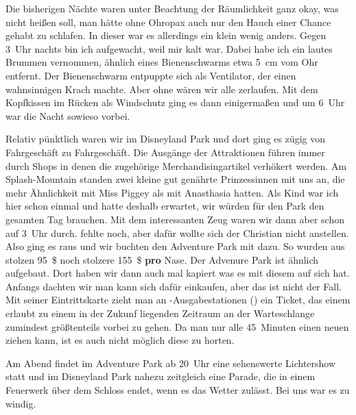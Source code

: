 Die bisherigen Nächte waren unter Beachtung der Räumlichkeit ganz okay, was nicht heißen soll, man hätte ohne Ohropax auch nur den Hauch einer Chance gehabt zu schlafen.
In dieser war es allerdings ein klein wenig anders.
Gegen 3~Uhr nachts bin ich aufgewacht, weil mir kalt war.
Dabei habe ich ein lautes Brummen vernommen, ähnlich eines Bienenschwarms etwa 5~cm vom Ohr entfernt.
Der Bienenschwarm entpuppte sich als Ventilator, der einen wahnsinnigen Krach machte.
Aber ohne wären wir alle zerlaufen.
Mit dem Kopfkissen im Rücken als Windschutz ging es dann einigermaßen und um 6~Uhr war die Nacht sowieso vorbei.

Relativ pünktlich waren wir im Disneyland Park und dort ging es zügig von Fahrgeschäft zu Fahrgeschäft.
Die Ausgänge der Attraktionen führen immer durch Shops in denen die zugehörige Merchandisingartikel verhökert werden.
Am Splash-Mountain standen zwei kleine gut genährte Prinzessinnen mit uns an, die mehr Ähnlichkeit mit Miss Piggey als mit Anasthasia hatten. 
Als Kind war ich hier schon einmal und hatte deshalb erwartet, wir würden für den Park den gesamten Tag brauchen.
Mit dem interessanten Zeug waren wir dann aber schon auf 3~Uhr durch.
 fehlte noch, aber dafür wollte sich der Christian nicht anstellen.
Also ging es raus und wir buchten den Adventure Park mit dazu.
So wurden aus stolzen 95~\$ noch stolzere 155~\$ \textbf{pro} Nase.
Der Advenure Park ist ähnlich aufgebaut.
Dort haben wir dann auch mal kapiert was es mit diesem  auf sich hat.
Anfangs dachten wir man kann sich dafür einkaufen, aber das ist nicht der Fall.
Mit seiner Eintrittskarte zieht man an -Ausgabestationen () ein Ticket, das einem erlaubt zu einem in der Zukunf liegenden Zeitraum an der Warteschlange zumindest größtenteils vorbei zu gehen.
Da man nur alle 45~Minuten einen neuen  ziehen kann, ist es auch nicht möglich diese zu horten.

Am Abend findet im Adventure Park ab 20~Uhr eine sehenswerte Lichtershow  statt und im Disneyland Park nahezu zeitgleich eine Parade, die in einem Feuerwerk über dem Schloss endet, wenn es das Wetter zulässt.
Bei uns war es zu windig.

